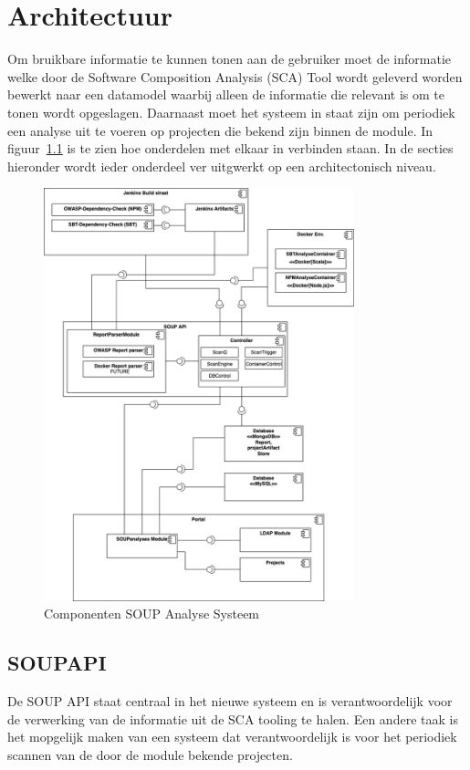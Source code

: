 \chapter{Architectuur}\label{ch:Architectuur}
Om bruikbare informatie te kunnen tonen aan de gebruiker moet de informatie welke door de Software Composition Analysis (SCA) Tool wordt geleverd worden bewerkt naar een datamodel waarbij alleen de informatie die relevant is om te tonen wordt opgeslagen. Daarnaast moet het systeem in staat zijn om periodiek een analyse uit te voeren op projecten die bekend zijn binnen de module. In figuur~\ref{fig:SOUP-Components} is te zien hoe onderdelen met elkaar in verbinden staan.
In de secties hieronder wordt ieder onderdeel ver uitgwerkt op een architectonisch niveau.

\begin{figure}[bth]
    \myfloatalign
    \includegraphics[width=9cm]{gfx/UMLcomponentDiagram}
    \caption{Componenten SOUP Analyse Systeem}
    \label{fig:SOUP-Components}
\end{figure}

\section{SOUPAPI}\label{sec:soupapi}
De SOUP API staat centraal in het nieuwe systeem en is verantwoordelijk voor de verwerking van de informatie uit de SCA tooling te halen. Een andere taak is het mopgelijk maken van een systeem dat verantwoordelijk is voor het periodiek scannen van de door de module bekende projecten.


